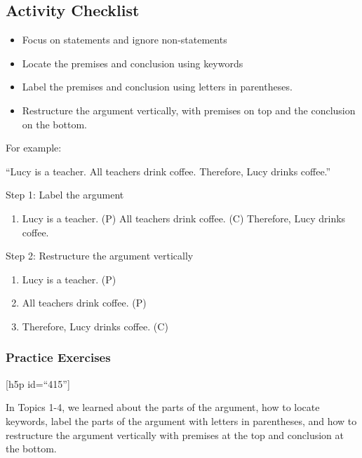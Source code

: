 \documentclass[
]{book}
\providecommand{\tightlist}{%
  \setlength{\itemsep}{0pt}\setlength{\parskip}{0pt}}
\begin{document}
\hypertarget{activity-checklist-1}{%
\subsection*{Activity Checklist}\label{activity-checklist-1}}

\begin{itemize}
\item
  Focus on statements and ignore non-statements
\item
  Locate the premises and conclusion using keywords
\item
  Label the premises and conclusion using letters in parentheses.
\item
  Restructure the argument vertically, with premises on top and the conclusion on the bottom.
\end{itemize}

For example:

``Lucy is a teacher. All teachers drink coffee. Therefore, Lucy drinks coffee.''

Step 1: Label the argument

\begin{enumerate}
\def\labelenumi{(\Alph{enumi})}
\setcounter{enumi}{15}
\tightlist
\item
  Lucy is a teacher. (P) All teachers drink coffee. (C) Therefore, Lucy drinks coffee.
\end{enumerate}

Step 2: Restructure the argument vertically

\begin{enumerate}
\def\labelenumi{\arabic{enumi}.}
\tightlist
\item
  Lucy is a teacher. (P)
\item
  All teachers drink coffee. (P)
\item
  Therefore, Lucy drinks coffee. (C)
\end{enumerate}

\hypertarget{practice-exercises}{%
\subsubsection*{Practice Exercises}\label{practice-exercises}}

{[}h5p id=``415''{]}

In Topics 1-4, we learned about the parts of the argument, how to locate keywords, label the parts of the argument with letters in parentheses, and how to restructure the argument vertically with premises at the top and conclusion at the bottom.
\end{document}
